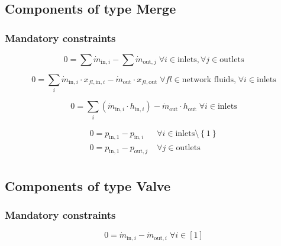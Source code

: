 \documentclass[]{article}
\begin{document}
\subsection{Components of type Merge}

\subsubsection{Mandatory constraints}

\begin{equation}
\label{eq:Merge_mass_flow_constraints}
0 =\sum\dot{m}_{\mathrm{in},i}-\sum\dot{m}_{\mathrm{out},j}\;\forall i \in \text{inlets}, \forall j \in \text{outlets}
\end{equation}

\begin{equation}
\label{eq:Merge_fluid_constraints}
0=\sum_i \dot{m}_{\mathrm{in,}i} \cdot x_{fl\mathrm{,in,}i}- \dot {m}_\mathrm{out} \cdot x_{fl\mathrm{,out}}\; \forall fl \in \text{network fluids,} \; \forall i \in\text{inlets}
\end{equation}

\begin{equation}
\label{eq:Merge_energy_balance_constraints}
0=\sum_i\left(\dot{m}_{\mathrm{in,}i}\cdot h_{\mathrm{in,}i}\right) - \dot{m}_\mathrm{out} \cdot h_\mathrm{out} \; \forall i \in \text{inlets}
\end{equation}

\begin{equation}
\label{eq:Merge_pressure_constraints}
\begin{split}
0 = p_\mathrm{in,1} - p_{\mathrm{in,}i} & \; \forall i \in \text{inlets} \setminus \left\lbrace 1\right\rbrace\\
0 = p_\mathrm{in,1} - p_{\mathrm{out,}j} & \; \forall j \in \text{outlets}\\
\end{split}
\end{equation}


\subsection{Components of type Valve}

\subsubsection{Mandatory constraints}

\begin{equation}
\label{eq:Valve_mass_flow_constraints}
0=\dot{m}_{\mathrm{in,}i}-\dot{m}_{\mathrm{out,}i}\; \forall i \in [1]
\end{equation}
\end{document}
